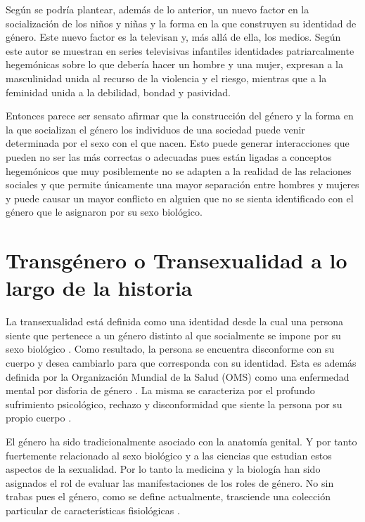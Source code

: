 Según \textcite{Anton2001} se podría plantear, además de lo anterior, un nuevo
factor en la socialización de los niños y niñas y la forma en la que construyen
su identidad de género. Este nuevo factor es la televisan y, más allá de ella,
los medios. Según este autor se muestran en series televisivas infantiles
identidades patriarcalmente hegemónicas sobre lo que debería hacer un hombre y
una mujer, expresan a la masculinidad unida al recurso de la violencia y el
riesgo, mientras que a la feminidad unida a la debilidad, bondad y pasividad.

Entonces parece ser
sensato afirmar que la construcción del género y la forma en la que socializan
el género los individuos de una sociedad puede venir determinada por el sexo con
el que nacen. Esto puede generar interacciones que pueden no ser las más
correctas o adecuadas pues están ligadas a conceptos hegemónicos que muy
posiblemente no se adapten a la realidad de las relaciones sociales y que
permite únicamente una mayor separación entre hombres y mujeres y puede causar
un mayor conflicto en alguien que no se sienta identificado con el género que le
asignaron por su sexo biológico.

\section{Transgénero o Transexualidad a lo largo de la historia}

La transexualidad está definida como una identidad desde la cual una persona
siente que pertenece a un género distinto al que socialmente se impone por su
sexo biológico \parencite{Helfrich2001}. Como resultado, la persona se encuentra
disconforme con su cuerpo y desea cambiarlo para que corresponda con su
identidad. Esta es además definida por la Organización Mundial de la Salud (OMS)
como una enfermedad mental por disforia de género \parencite{BergeroMiguel2008}.
La misma se caracteriza por el profundo sufrimiento psicológico, rechazo y
disconformidad que siente la persona por su propio cuerpo \parencite{APA}.

El género ha sido tradicionalmente asociado con la anatomía genital. Y por tanto
fuertemente relacionado al sexo biológico y a las ciencias que estudian estos
aspectos de la sexualidad. Por lo tanto la medicina y la biología han sido
asignados el rol de evaluar las manifestaciones de los roles de género. No sin
trabas pues el género, como se define actualmente, trasciende una colección
particular de características fisiológicas \parencite{Butler2001}.

